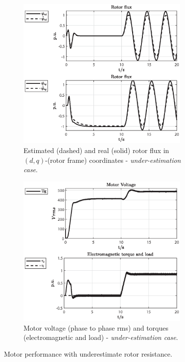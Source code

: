 \documentclass[11pt,a4paper,oneside]{book}
\numberwithin{equation}{section}
\theoremstyle{it}
\theoremstyle{definition}
\begin{document}
\begin{figure}[H]
	\centering
	\begin{subfigure}{0.5\textwidth}
	\centering
	\includegraphics[width = 240pt, keepaspectratio]{figures/under_est/rotor_flux_est_2.eps}
	\captionsetup{width=0.65\textwidth,font=footnotesize}		
	\caption{Estimated (dashed) and real (solid) rotor flux in $(d,q)$-(rotor frame) coordinates - \textit{under-estimation case}.}
	\label{fig_sim_res_7}
	\end{subfigure}%
	\begin{subfigure}{0.5\textwidth}
	\centering
	\includegraphics[width = 240pt, keepaspectratio]{figures/under_est/motor_voltage.eps}
	\captionsetup{width=0.65\textwidth,font=footnotesize}		
	\caption{Motor voltage (phase to phase rms) and torques (electromagnetic and load) - \textit{under-estimation case}.}
	\label{fig_sim_res_8}
	\end{subfigure}		
	\captionsetup{width=0.5\textwidth, font=small}		
	\caption{Motor performance with underestimate rotor resistance.}
	\label{}
\end{figure}
\end{document}
